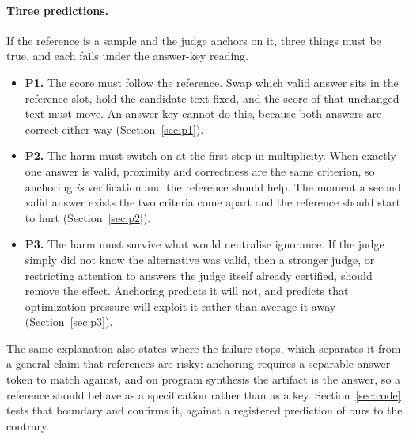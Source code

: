 \documentclass[11pt]{article}
\begin{document}
\paragraph{Three predictions.}
If the reference is a sample and the judge anchors on it, three things must be true, and each fails under the answer-key reading.

\begin{itemize}
\item \textbf{P1.} The score must follow the reference. Swap which valid answer sits in the reference slot, hold the candidate text fixed, and the score of that unchanged text must move. An answer key cannot do this, because both answers are correct either way (Section~\ref{sec:p1}).
\item \textbf{P2.} The harm must switch on at the first step in multiplicity. When exactly one answer is valid, proximity and correctness are the same criterion, so anchoring \emph{is} verification and the reference should help. The moment a second valid answer exists the two criteria come apart and the reference should start to hurt (Section~\ref{sec:p2}).
\item \textbf{P3.} The harm must survive what would neutralise ignorance. If the judge simply did not know the alternative was valid, then a stronger judge, or restricting attention to answers the judge itself already certified, should remove the effect. Anchoring predicts it will not, and predicts that optimization pressure will exploit it rather than average it away (Section~\ref{sec:p3}).
\end{itemize}

The same explanation also states where the failure stops, which separates it from a general claim that references are risky: anchoring requires a separable answer token to match against, and on program synthesis the artifact is the answer, so a reference should behave as a specification rather than as a key.
Section~\ref{sec:code} tests that boundary and confirms it, against a registered prediction of ours to the contrary.
\end{document}
